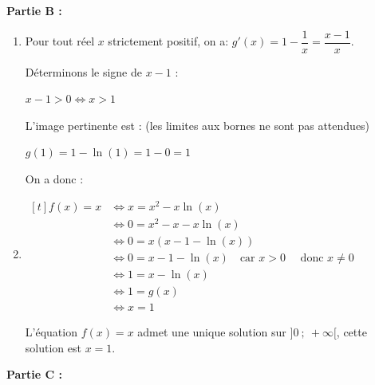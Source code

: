 \documentclass[10pt]{article}
\begin{document}
\textbf{Partie B :}

\medskip

\begin{enumerate}
	\item Pour tout réel $x$ strictement positif, on a: $g'(x) =1 - \dfrac{1}{x}= \dfrac{x-1}{x}$.

Déterminons le signe de $x-1$ :

$ x-1 >0 \iff x > 1 $

L'image pertinente est : (les limites aux bornes ne sont pas attendues)

$g(1)= 1-\ln(1)=1-0=1$

On a donc :

	\item $\begin{aligned}[t] f(x) = x &\iff x = x^2-x\ln(x) \\
	&\iff 0 = x^2-x-x\ln(x) \\
	&\iff 0 = x\left( x-1-\ln(x)\right)\\
	&\iff 0 = x-1-\ln(x) \quad \text{car } x>0 \quad \text{ donc } x\neq0 \\
	& \iff 1 = x-\ln(x)\\
	&\iff 1 = g(x)\\
	&\iff x = 1 \end{aligned}$

L'équation $f(x)=x$ admet une unique solution sur $]0~;~+\infty[$, cette solution est $x=1$.
\end{enumerate}

\medskip

\textbf{Partie C :}

\medskip
\end{document}
